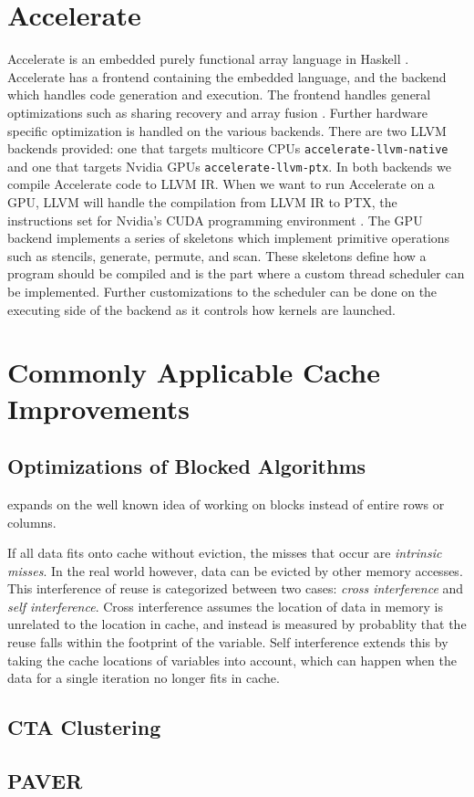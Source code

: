 \section{Accelerate}
\label{sec:accelerate}
Accelerate is an embedded purely functional array language in Haskell \cite{chakravarty2011accelerating}.
Accelerate has a frontend containing the embedded language, and the backend which handles code generation and execution.
The frontend handles general optimizations such as sharing recovery and array fusion \cite{mcdonell2013optimising,balen2020optimal}.
Further hardware specific optimization is handled on the various backends.
There are two LLVM \cite{llvm} backends provided: one that targets multicore CPUs \texttt{accelerate-llvm-native} and one that targets Nvidia GPUs \texttt{accelerate-llvm-ptx}.
In both backends we compile Accelerate code to LLVM IR.
When we want to run Accelerate on a GPU, LLVM will handle the compilation from LLVM IR to PTX, the instructions set for Nvidia's CUDA programming environment \cite{mcdonell2015type, llvm, nvidia2021cudadocs}.
The GPU backend implements a series of skeletons which implement primitive operations such as stencils, generate, permute, and scan.
These skeletons define how a program should be compiled and is the part where a custom thread scheduler can be implemented.
Further customizations to the scheduler can be done on the executing side of the backend as it controls how kernels are launched.

\section{Commonly Applicable Cache Improvements}

\subsection{Optimizations of Blocked Algorithms}
\label{sec:optimization_blocked}
\citeauthor{lam1991cache} expands on the well known idea of working on blocks instead of entire rows or columns.

If all data fits onto cache without eviction, the misses that occur are \textit{intrinsic misses}.
In the real world however, data can be evicted by other memory accesses.
This interference of reuse is categorized between two cases: \textit{cross interference} and \textit{self interference}.
Cross interference assumes the location of data in memory is unrelated to the location in cache, and instead is measured by probablity that the reuse falls within the footprint of the variable.
Self interference extends this by taking the cache locations of variables into account, which can happen when the data for a single iteration no longer fits in cache.
\cite{lam1991cache}

\subsection{CTA Clustering}

\subsection{PAVER}

